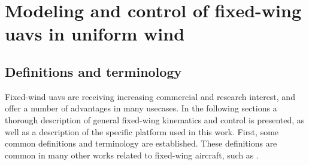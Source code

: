 
\chapter{Modeling and control of fixed-wing \acsp{uav} in uniform wind}\label{cha:fixed_wing_uav}
\section{Definitions and terminology}
Fixed-wind \acp{uav} are receiving increasing commercial and research interest, and offer a number of advantages in many usecases. In the following sections a thorough description of
general fixed-wing kinematics and control is presented, as well as a description of the specific platform used in this work. 
First, some common definitions and terminology are established. These definitions are 
 common in many other works related to fixed-wing aircraft, such as \cite{uav_dynamics_wind}. 

